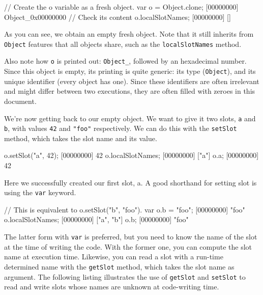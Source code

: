 \begin{urbiscript}
// Create the o variable as a fresh object.
var o = Object.clone;
[00000000] Object_0x00000000
// Check its content
o.localSlotNames;
[00000000] []
\end{urbiscript}

As you can see, we obtain an empty fresh object. Note that it still
inherits from \lstinline{Object} features that all objects share, such as
the \lstinline{localSlotNames} method.

Also note how \lstinline{o} is printed out: \lstinline{Object_},
followed by an hexadecimal number. Since this object is empty, its
printing is quite generic: its type (\lstinline{Object}), and its
unique identifier (every \us object has one). Since these identifiers
are often irrelevant and might differ between two executions, they are
often filled with zeroes in this document.

We're now getting back to our empty object. We want to give it two
slots, \lstinline{a} and \lstinline{b}, with values \lstinline|42| and
\lstinline|"foo"| respectively. We can do this with the
\lstinline{setSlot} method, which takes the slot name and
its value.

\begin{urbiscript}[firstnumber=last]
o.setSlot("a", 42);
[00000000] 42
o.localSlotNames;
[00000000] ["a"]
o.a;
[00000000] 42
\end{urbiscript}

Here we successfully created our first slot, a. A good shorthand for
setting slot is using the \lstinline{var} keyword.

\begin{urbiscript}[firstnumber=last]
// This is equivalent to o.setSlot("b", "foo").
var o.b = "foo";
[00000000] "foo"
o.localSlotNames;
[00000000] ["a", "b"]
o.b;
[00000000] "foo"
\end{urbiscript}

The latter form with \lstinline{var} is preferred, but you need to know
the name of the slot at the time of writing the code. With the former
one, you can compute the slot name at execution time. Likewise, you
can read a slot with a run-time determined name with the
\lstinline{getSlot} method, which takes the slot name as
argument.  The following listing illustrates the use of
\lstinline{getSlot} and \lstinline{setSlot} to read and write slots whose
names are unknown at code-writing time.


